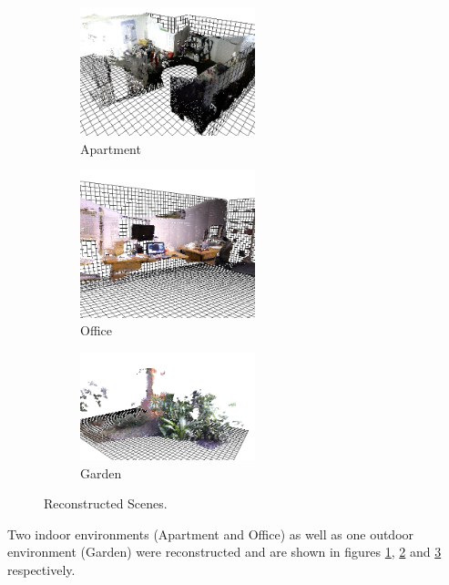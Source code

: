 

\begin{figure}[t] 
        \centering
        \begin{subfigure}[b]{2.0in}
                \includegraphics[width=2.0in]{images/ch2/unit21}
                \caption{Apartment}
                \label{fig:RECON_UNIT}
        \end{subfigure}%
        \begin{subfigure}[b]{2.0in}
                \includegraphics[width=2.0in]{images/ch2/officeA}
                \caption{Office}
                \label{fig:RECON_OFFICE}
        \end{subfigure}%
        \begin{subfigure}[b]{2.0in}
                \includegraphics[width=2.0in]{images/ch2/outdoorA}
                \caption{Garden}
                \label{fig:RECON_GARDEN}
        \end{subfigure}
       \caption{Reconstructed Scenes.}
       \label{fig:RECONSTRUCTIONS}
\end{figure}

Two indoor environments (Apartment and Office) as well as one outdoor environment (Garden) were reconstructed and are shown in figures \ref{fig:RECON_UNIT}, \ref{fig:RECON_OFFICE} and \ref{fig:RECON_GARDEN} respectively. \\

